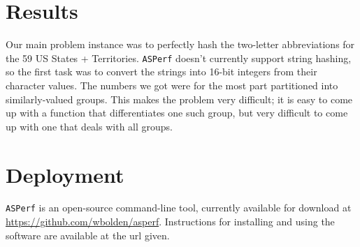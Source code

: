 \documentclass{article}
\begin{document}
\section{Results}

Our main problem instance was to perfectly hash the two-letter abbreviations for the 59 US States + Territories. \texttt{ASPerf} doesn't currently support string hashing, so the first task was to convert the strings into 16-bit integers from their character values. The numbers we got were for the most part partitioned into similarly-valued groups. This makes the problem very difficult; it is easy to come up with a function that differentiates one such group, but very difficult to come up with one that deals with all groups.


\section{Deployment}

\texttt{ASPerf} is an open-source command-line tool, currently available for download at \href{https://github.com/wbolden/asperf}{https://github.com/wbolden/asperf}. Instructions for installing and using the software are available at the url given.
\end{document}
